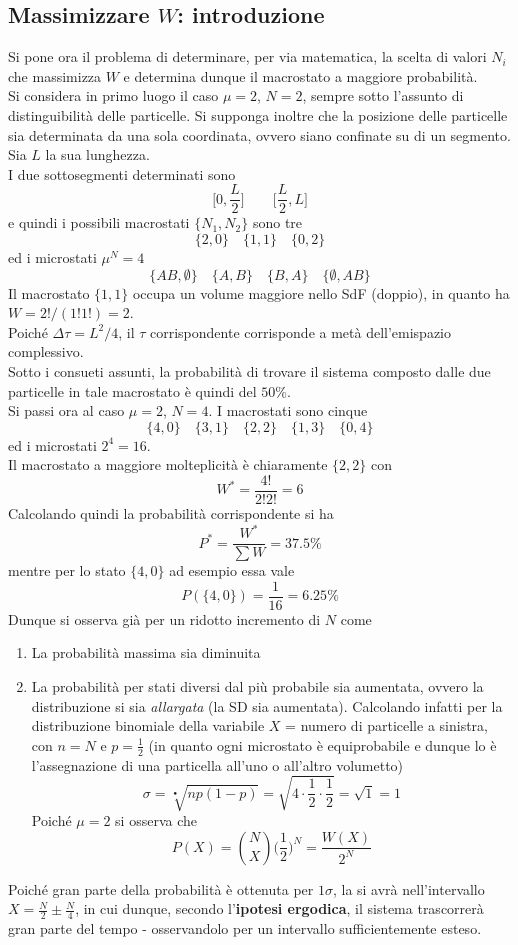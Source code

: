 \documentclass[10pt, oneside]{book}
\newcommand{\ds}{\displaystyle}
\newcommand{\setel}[1]{ \{ #1\} }
\begin{document}
\subsection{Massimizzare $W$: introduzione}
Si pone ora il problema di determinare, per via matematica, la scelta di valori $N_i$ che massimizza $W$ e determina dunque il macrostato a maggiore probabilità.\\
Si considera in primo luogo il caso $\mu = 2$, $N = 2$, sempre sotto l'assunto di distinguibilità delle particelle. Si supponga inoltre che la posizione delle particelle sia determinata da una sola coordinata, ovvero siano confinate su di un segmento. Sia $L$ la sua lunghezza.\\
I due sottosegmenti determinati sono
\[\big[0, \frac{L}{2}\big] \qquad \big[\frac{L}{2}, L\big]\]
e quindi i possibili macrostati $\{N_1, N_2\}$ sono tre 
\[\{2,0\} \quad \{1,1\} \quad \{0,2\}\]
ed i microstati $\mu^N = 4$
\[\setel{AB, \emptyset} \quad \setel{A,B} \quad \setel{B,A} \quad \setel{\emptyset, AB}\]
Il macrostato $\ds \setel{1,1}$ occupa un volume maggiore nello SdF (doppio), in quanto ha $\ds W = 2! \big/ (1! 1!) = 2$.\\
Poiché $\ds \Delta \tau = L^2 \big/ 4$, il $\tau$ corrispondente corrisponde a metà dell'emispazio complessivo.\\
Sotto i consueti assunti, la probabilità di trovare il sistema composto dalle due particelle in tale macrostato è quindi del $50\%$.\\
Si passi ora al caso $\mu = 2$, $N = 4$. I macrostati sono cinque
\[\setel{4,0} \quad \setel{3,1} \quad \setel{2,2} \quad \setel{1,3} \quad \setel{0,4}\]
ed i microstati $2^4 = 16$.\\
Il macrostato a maggiore molteplicità è chiaramente $\ds \setel{2,2}$ con 
\[W^\ast = \frac{4!}{2!2!} = 6\]
Calcolando quindi la probabilità corrispondente si ha
\[P^\ast = \frac{W^\ast}{\sum W} = 37.5\%\]
mentre per lo stato $\setel{4,0}$ ad esempio essa vale
\[P(\setel{4,0}) = \frac{1}{16} = 6.25 \%\]
Dunque si osserva già per un ridotto incremento di $N$ come
\begin{enumerate}
\item La probabilità massima sia diminuita
\item La probabilità per stati diversi dal più probabile sia aumentata, ovvero la distribuzione si sia \textit{allargata} (la SD sia aumentata). Calcolando infatti per la distribuzione binomiale della variabile $X$ = numero di particelle a sinistra, con $n = N$ e $p = \frac{1}{2}$ (in quanto ogni microstato è equiprobabile e dunque lo è l'assegnazione di una particella all'uno o all'altro volumetto)
\[\sigma = \sqrt[•]{np(1-p)} = \sqrt{4 \cdot \frac{1}{2} \cdot \frac{1}{2}} = \sqrt{1} = 1\]
Poiché $\mu = 2$ si osserva che
\[P(X) = \binom{N}{X} \bigg(\frac{1}{2}\bigg)^{N} = \frac{W(X)}{2^N}\]
\end{enumerate}
Poiché gran parte della probabilità è ottenuta per $1 \sigma$, la si avrà nell'intervallo $X = \frac{N}{2} \pm \frac{N}{4}$, in cui dunque, secondo l'\textbf{ipotesi ergodica}, il sistema trascorrerà gran parte del tempo - osservandolo per un intervallo sufficientemente esteso.
\end{document}

